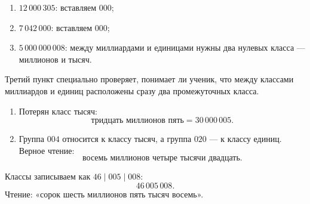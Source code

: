 \begin{teacheranswer}[Задание 5]
  \begin{enumerate}
    \item \(12\,000\,305\): вставляем \(000\);
    \item \(7\,042\,000\): вставляем \(000\);
    \item \(5\,000\,000\,008\): между миллиардами и единицами нужны два
      нулевых класса --- миллионов и тысяч.
  \end{enumerate}
\end{teacheranswer}

\begin{criterionbox}
  Третий пункт специально проверяет, понимает ли ученик, что между классами
  миллиардов и единиц расположены сразу два промежуточных класса.
\end{criterionbox}

\begin{teacheranswer}[Задание 6]
  \begin{enumerate}
    \item Потерян класс тысяч:
      \[
        \text{тридцать миллионов пять}=30\,000\,005.
      \]
    \item Группа \(004\) относится к классу тысяч, а группа \(020\) --- к
      классу единиц. Верное чтение:
      \[
        \text{восемь миллионов четыре тысячи двадцать}.
      \]
  \end{enumerate}
\end{teacheranswer}

\begin{teacheranswer}[Задание 7*]
  Классы записываем как \(46\;|\;005\;|\;008\):
  \[
    \boxed{46\,005\,008}.
  \]
  Чтение: «сорок шесть миллионов пять тысяч восемь».
\end{teacheranswer}
